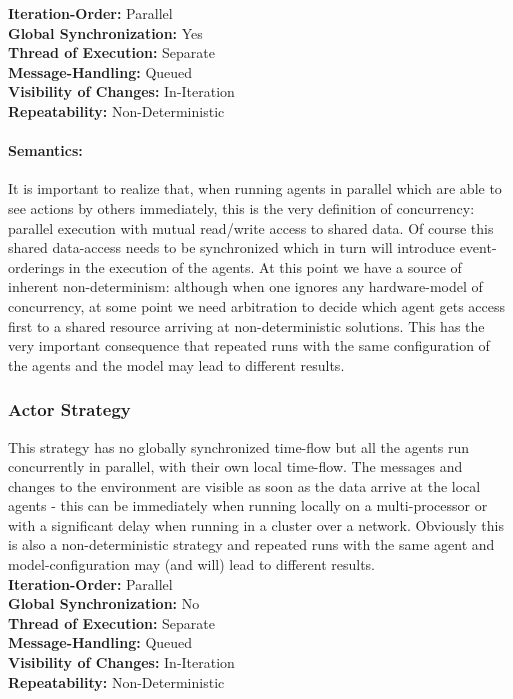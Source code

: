 \textbf{Iteration-Order:} Parallel \\
\textbf{Global Synchronization:} Yes \\
\textbf{Thread of Execution:} Separate \\
\textbf{Message-Handling:} Queued \\
\textbf{Visibility of Changes:}	In-Iteration \\
\textbf{Repeatability:}	Non-Deterministic

\paragraph{Semantics:} It is important to realize that, when running agents in parallel which are able to see actions by others immediately, this is the very definition of concurrency: parallel execution with mutual read/write access to shared data. Of course this shared data-access needs to be synchronized which in turn will introduce event-orderings in the execution of the agents. At this point we have a source of inherent non-determinism: although when one ignores any hardware-model of concurrency, at some point we need arbitration to decide which agent gets access first to a shared resource arriving at non-deterministic solutions. This has the very important consequence that repeated runs with the same configuration of the agents and the model may lead to different results.


\subsubsection{Actor Strategy}
This strategy has no globally synchronized time-flow but all the agents run concurrently in parallel, with their own local time-flow. The messages and changes to the environment are visible as soon as the data arrive at the local agents - this can be immediately when running locally on a multi-processor or with a significant delay when running in a cluster over a network. Obviously this is also a non-deterministic strategy and repeated runs with the same agent and model-configuration may (and will) lead to different results. \\

\textbf{Iteration-Order:} Parallel \\
\textbf{Global Synchronization:} No \\
\textbf{Thread of Execution:} Separate \\
\textbf{Message-Handling:} Queued \\
\textbf{Visibility of Changes:}	In-Iteration \\
\textbf{Repeatability:}	Non-Deterministic

